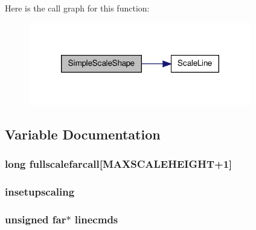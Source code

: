 Here is the call graph for this function:
\nopagebreak
\begin{figure}[H]
\begin{center}
\leavevmode
\includegraphics[width=276pt]{WL__SCALE_8C_a11d04052928f61aec9102f6cce71fadb_cgraph}
\end{center}
\end{figure}




\subsection{Variable Documentation}
\hypertarget{WL__SCALE_8C_a4b3db832e1c51c7a13e5e973de3115b3}{
\subsubsection[{fullscalefarcall}]{\setlength{\rightskip}{0pt plus 5cm}long {\bf fullscalefarcall}\mbox{[}MAXSCALEHEIGHT+1\mbox{]}}}
\label{WL__SCALE_8C_a4b3db832e1c51c7a13e5e973de3115b3}
\hypertarget{WL__SCALE_8C_a8fb7a0719ca4fe8c02ecd0895589c0be}{
\subsubsection[{insetupscaling}]{ {\bf insetupscaling}}}
\label{WL__SCALE_8C_a8fb7a0719ca4fe8c02ecd0895589c0be}
\hypertarget{WL__SCALE_8C_aa68026c177907246bf15db85bc76f61c}{
\subsubsection[{linecmds}]{\setlength{\rightskip}{0pt plus 5cm}unsigned far$\ast$ {\bf linecmds}}}
\label{WL__SCALE_8C_aa68026c177907246bf15db85bc76f61c}
